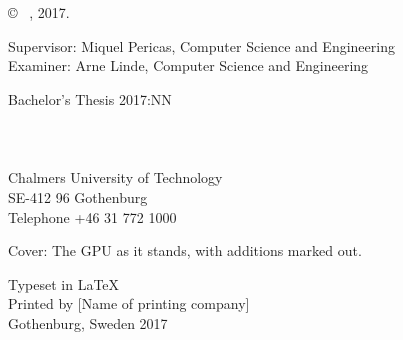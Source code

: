 \newpage
\thispagestyle{plain}
\vspace*{4.5cm}
\varHeadline \\
\varSubtitle \\
\varNames \setlength{\parskip}{1cm}

\copyright ~ \varNames, 2017. \setlength{\parskip}{1cm}

Supervisor: Miquel Pericas, Computer Science and Engineering\\
Examiner: Arne Linde, Computer Science and Engineering \setlength{\parskip}{1cm}

Bachelor's Thesis 2017:NN\\	%
\varDepartment \\
\varDivision \\
\varResearchGroupName\\
Chalmers University of Technology\\
SE-412 96 Gothenburg\\
Telephone +46 31 772 1000 \setlength{\parskip}{0.5cm}

\vfill
Cover: The GPU as it stands, with additions marked out. \setlength{\parskip}{0.5cm}

Typeset in \LaTeX \\
Printed by [Name of printing company]\\
Gothenburg, Sweden 2017

